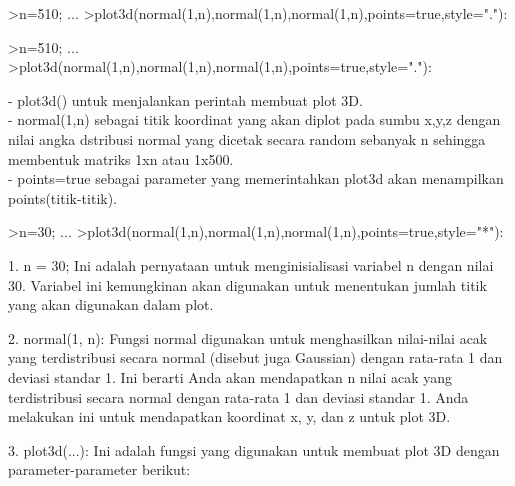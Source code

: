 \documentclass[a4paper,10pt]{article}
\begin{document}
\begin{eulernotebook}
\begin{eulercomment}
\begin{eulercomment}
\begin{eulercomment}
\begin{eulercomment}
\begin{eulercomment}
\begin{eulercomment}
\begin{eulercomment}
\begin{eulercomment}
\begin{eulercomment}
\end{eulercomment}
\begin{eulerprompt}
>n=510; ...
>plot3d(normal(1,n),normal(1,n),normal(1,n),points=true,style="."):
\end{eulerprompt}
\begin{eulercomment}
\textgreater{}n=510; ...\\
\textgreater{}plot3d(normal(1,n),normal(1,n),normal(1,n),points=true,style="."):

- plot3d() untuk menjalankan perintah membuat plot 3D.\\
- normal(1,n) sebagai titik koordinat yang akan diplot pada sumbu
x,y,z dengan nilai angka dstribusi normal yang dicetak secara random
sebanyak n sehingga membentuk matriks 1xn atau 1x500.\\
- points=true sebagai parameter yang memerintahkan plot3d akan
menampilkan points(titik-titik).

\end{eulercomment}
\begin{eulerprompt}
>n=30; ...
>plot3d(normal(1,n),normal(1,n),normal(1,n),points=true,style="*"):
\end{eulerprompt}
\begin{eulercomment}
1. n = 30; Ini adalah pernyataan untuk menginisialisasi variabel n
dengan nilai 30. Variabel ini kemungkinan akan digunakan untuk
menentukan jumlah titik yang akan digunakan dalam plot.

2. normal(1, n): Fungsi normal digunakan untuk menghasilkan
nilai-nilai acak yang terdistribusi secara normal (disebut juga
Gaussian) dengan rata-rata 1 dan deviasi standar 1. Ini berarti Anda
akan mendapatkan n nilai acak yang terdistribusi secara normal dengan
rata-rata 1 dan deviasi standar 1. Anda melakukan ini untuk
mendapatkan koordinat x, y, dan z untuk plot 3D.

3. plot3d(...): Ini adalah fungsi yang digunakan untuk membuat plot 3D
dengan parameter-parameter berikut:


\end{eulercomment}
\end{eulercomment}
\end{eulercomment}
\end{eulercomment}
\end{eulercomment}
\end{eulercomment}
\end{eulercomment}
\end{eulercomment}
\end{eulercomment}
\end{eulernotebook}
\end{document}
